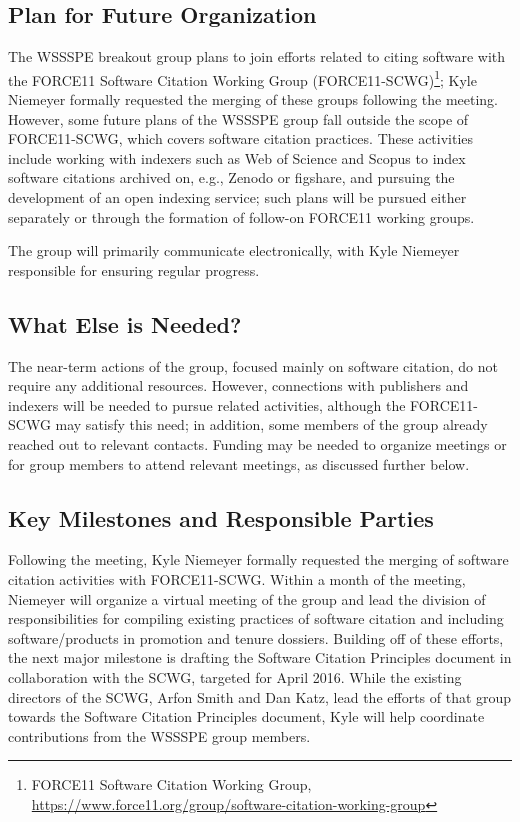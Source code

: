 \subsection{Plan for Future Organization}
\label{SC:plan}

The WSSSPE breakout group plans to join efforts related to citing software with
the FORCE11 Software Citation Working Group (FORCE11-SCWG)\footnote{FORCE11
Software Citation Working Group,
\url{https://www.force11.org/group/software-citation-working-group}}; Kyle
Niemeyer formally requested the merging of these groups following the meeting.
However, some future plans of the WSSSPE group fall outside the scope of
FORCE11-SCWG, which covers software citation practices. These activities include
working with indexers such as Web of Science and Scopus to index software
citations archived on, e.g., Zenodo or figshare, and pursuing the development of
an open indexing service; such plans will be pursued either separately or
through the formation of follow-on FORCE11 working groups.

The group will primarily communicate electronically, with Kyle Niemeyer
responsible for ensuring regular progress.

\subsection{What Else is Needed?}

The near-term actions of the group, focused mainly on software citation, do not
require any additional resources. However, connections with publishers and
indexers will be needed to pursue related activities, although the FORCE11-SCWG
may satisfy this need; in addition, some members of the group already reached
out to relevant contacts. Funding may be needed to organize meetings or for
group members to attend relevant meetings, as discussed further below.

\subsection{Key Milestones and Responsible Parties}

Following the meeting, Kyle Niemeyer formally requested the merging of software
citation activities with FORCE11-SCWG. Within a month of the meeting, Niemeyer will
organize a virtual meeting of the group and lead the division of
responsibilities for compiling existing practices of software citation and
including software\slash products in promotion and tenure dossiers. Building off
of these efforts, the next major milestone is drafting the Software Citation
Principles document in collaboration with the SCWG, targeted for April 2016.
While the existing directors of the SCWG, Arfon Smith and Dan Katz, lead the
efforts of that group towards the Software Citation Principles document, Kyle
will help coordinate contributions from the WSSSPE group members.



